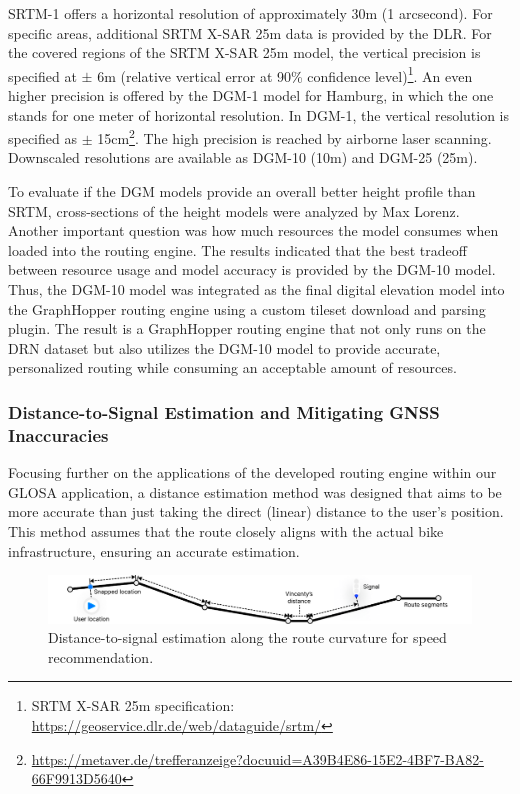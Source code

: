 SRTM-1 offers a horizontal resolution of approximately 30m (1 arcsecond). For specific areas, additional SRTM X-SAR 25m data is provided by the DLR. For the covered regions of the SRTM X-SAR 25m model, the vertical precision is specified at $\pm$ 6m (relative vertical error at 90\% confidence level)\footnote{SRTM X-SAR 25m specification: \url{https://geoservice.dlr.de/web/dataguide/srtm/}}. An even higher precision is offered by the DGM-1 model for Hamburg, in which the one stands for one meter of horizontal resolution. In DGM-1, the vertical resolution is specified as $\pm$ 15cm\footnote{\url{https://metaver.de/trefferanzeige?docuuid=A39B4E86-15E2-4BF7-BA82-66F9913D5640}}. The high precision is reached by airborne laser scanning. Downscaled resolutions are available as DGM-10 (10m) and DGM-25 (25m).

To evaluate if the DGM models provide an overall better height profile than SRTM, cross-sections of the height models were analyzed by Max Lorenz. Another important question was how much resources the model consumes when loaded into the routing engine. The results indicated that the best tradeoff between resource usage and model accuracy is provided by the DGM-10 model. Thus, the DGM-10 model was integrated as the final digital elevation model into the GraphHopper routing engine using a custom tileset download and parsing plugin. The result is a GraphHopper routing engine that not only runs on the DRN dataset but also utilizes the DGM-10 model to provide accurate, personalized routing while consuming an acceptable amount of resources. 

\subsubsection{Distance-to-Signal Estimation and Mitigating GNSS Inaccuracies}

Focusing further on the applications of the developed routing engine within our GLOSA application, a distance estimation method was designed that aims to be more accurate than just taking the direct (linear) distance to the user's position. This method assumes that the route closely aligns with the actual bike infrastructure, ensuring an accurate estimation.

\begin{figure}[t]
\centering
\includegraphics[width=\linewidth]{images/distance-to-signal-estimation.pdf}
\caption{Distance-to-signal estimation along the route curvature for speed recommendation.}
\label{fig:distance-to-signal-estimation}
\end{figure}

